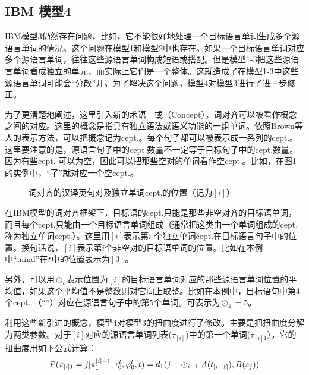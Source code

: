\subsection{IBM 模型4}

\parinterval IBM模型3仍然存在问题，比如，它不能很好地处理一个目标语言单词生成多个源语言单词的情况。这个问题在模型1和模型2中也存在。如果一个目标语言单词对应多个源语言单词，往往这些源语言单词构成短语或搭配。但是模型1-3把这些源语言单词看成独立的单元，而实际上它们是一个整体。这就造成了在模型1-3中这些源语言单词可能会“分散”开。为了解决这个问题，模型4对模型3进行了进一步修正。

\parinterval 为了更清楚地阐述，这里引入新的术语\ \dash \ {\small{}}或{\small{}}（Concept）。词对齐可以被看作概念之间的对应。这里的概念是指具有独立语法或语义功能的一组单词。依照Brown等人的表示方法，可以把概念记为cept.。每个句子都可以被表示成一系列的cept.。这里要注意的是，源语言句子中的cept.数量不一定等于目标句子中的cept.数量。因为有些cept. 可以为空，因此可以把那些空对的单词看作空cept.。比如，在图\ref{fig:6-8}的实例中，“了”就对应一个空cept.。

\begin{figure}[htp]
    \centering

   \caption{词对齐的汉译英句对及独立单词cept.的位置（记为$[i]$）}
   \label{fig:6-8}
\end{figure}

\parinterval 在IBM模型的词对齐框架下，目标语的cept.只能是那些非空对齐的目标语单词，而且每个cept.只能由一个目标语言单词组成（通常把这类由一个单词组成的cept.称为独立单词cept.）。这里用$[i]$表示第$i$ 个独立单词cept.在目标语言句子中的位置。换句话说，$[i]$表示第$i$个非空对的目标语单词的位置。比如在本例中“mind”在${t}$中的位置表示为$[3]$。

\parinterval 另外，可以用$\odot_{i}$表示位置为$[i]$的目标语言单词对应的那些源语言单词位置的平均值，如果这个平均值不是整数则对它向上取整。比如在本例中，目标语句中第4个cept. （“.”）对应在源语言句子中的第5个单词。可表示为${\odot}_{4}=5$。

\parinterval 利用这些新引进的概念，模型4对模型3的扭曲度进行了修改。主要是把扭曲度分解为两类参数。对于$[i]$对应的源语言单词列表($\tau_{[i]}$)中的第一个单词($\tau_{[i]1}$），它的扭曲度用如下公式计算：
\begin{equation}
{P}(\pi_{[i]1}=j|{\pi}_1^{[i]-1},{\tau}_0^l,{\varphi}_0^l,{t})=d_{1}(j-{\odot}_{i-1}|A(t_{[i-1]}),B(s_j))
\label{eq:6-22}
\end{equation}

